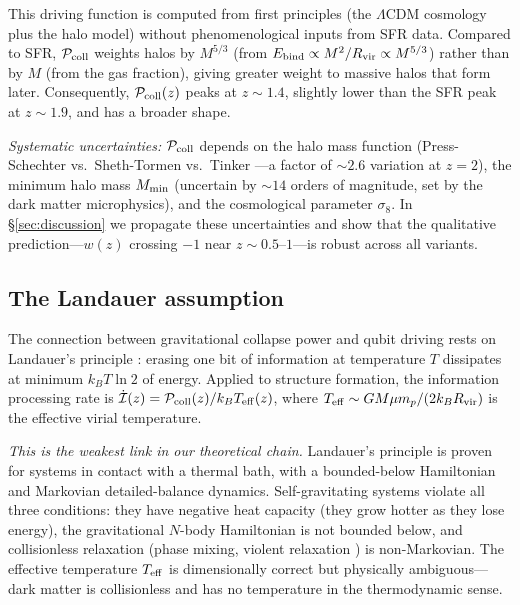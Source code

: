 \documentclass[aps,prd,twocolumn,superscriptaddress]{revtex4-2}
\begin{document}
This driving function is computed from first principles (the $\Lambda$CDM cosmology plus the halo model) without phenomenological inputs from SFR data. Compared to SFR, $\mathcal{P}_{\rm coll}$ weights halos by $M^{5/3}$ (from $E_{\rm bind} \propto M^2/R_{\rm vir} \propto M^{5/3}$) rather than by $M$ (from the gas fraction), giving greater weight to massive halos that form later. Consequently, $\mathcal{P}_{\rm coll}(z)$ peaks at $z \sim 1.4$, slightly lower than the SFR peak at $z \sim 1.9$, and has a broader shape.

\emph{Systematic uncertainties:} $\mathcal{P}_{\rm coll}$ depends on the halo mass function (Press-Schechter vs.\ Sheth-Tormen vs.\ Tinker \cite{Tinker:2008}---a factor of $\sim 2.6$ variation at $z=2$), the minimum halo mass $M_{\rm min}$ (uncertain by $\sim 14$ orders of magnitude, set by the dark matter microphysics), and the cosmological parameter $\sigma_8$. In \S\ref{sec:discussion} we propagate these uncertainties and show that the qualitative prediction---$w(z)$ crossing $-1$ near $z \sim 0.5$--$1$---is robust across all variants.

\subsection{The Landauer assumption}

\label{sec:landauer}

The connection between gravitational collapse power and qubit driving rests on Landauer's principle \cite{Landauer:1961}: erasing one bit of information at temperature $T$ dissipates at minimum $k_B T \ln 2$ of energy. Applied to structure formation, the information processing rate is $\dot{\mathcal{I}}(z) = \mathcal{P}_{\rm coll}(z) / k_B T_{\rm eff}(z)$, where $T_{\rm eff} \sim GM\mu m_p/(2k_B R_{\rm vir})$ is the effective virial temperature.

\emph{This is the weakest link in our theoretical chain.} Landauer's principle is proven for systems in contact with a thermal bath, with a bounded-below Hamiltonian and Markovian detailed-balance dynamics. Self-gravitating systems violate all three conditions: they have negative heat capacity (they grow hotter as they lose energy), the gravitational $N$-body Hamiltonian is not bounded below, and collisionless relaxation (phase mixing, violent relaxation \cite{LyndenBell:1967}) is non-Markovian. The effective temperature $T_{\rm eff}$ is dimensionally correct but physically ambiguous---dark matter is collisionless and has no temperature in the thermodynamic sense.
\end{document}
